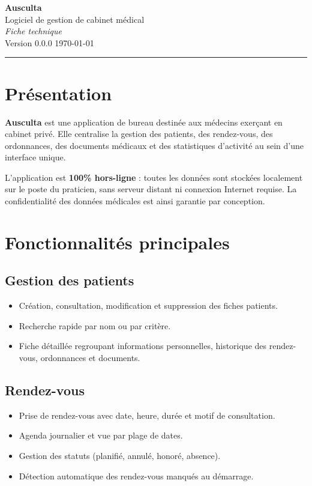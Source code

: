 \documentclass[11pt,a4paper]{article}
\begin{document}
\begin{center}
  {\Huge\bfseries\color{primary} Ausculta}\\[4pt]
  {\large Logiciel de gestion de cabinet médical}\\[2pt]
  \textit{Fiche technique}\\[6pt]
  \small Version 0.0.0 \quad\textbullet\quad \today
\end{center}

\vspace{4pt}
\hrule
\vspace{10pt}

\section{Présentation}

\textbf{Ausculta} est une application de bureau destinée aux médecins
exerçant en cabinet privé. Elle centralise la gestion des patients, des
rendez-vous, des ordonnances, des documents médicaux et des statistiques
d'activité au sein d'une interface unique.

\medskip
L'application est \textbf{100\% hors-ligne} : toutes les données sont
stockées localement sur le poste du praticien, sans serveur distant ni
connexion Internet requise. La confidentialité des données médicales est
ainsi garantie par conception.

\section{Fonctionnalités principales}

\subsection*{Gestion des patients}
\begin{itemize}
  \item Création, consultation, modification et suppression des fiches patients.
  \item Recherche rapide par nom ou par critère.
  \item Fiche détaillée regroupant informations personnelles, historique
        des rendez-vous, ordonnances et documents.
\end{itemize}

\subsection*{Rendez-vous}
\begin{itemize}
  \item Prise de rendez-vous avec date, heure, durée et motif de consultation.
  \item Agenda journalier et vue par plage de dates.
  \item Gestion des statuts (planifié, annulé, honoré, absence).
  \item Détection automatique des rendez-vous manqués au démarrage.
\end{itemize}
\end{document}
